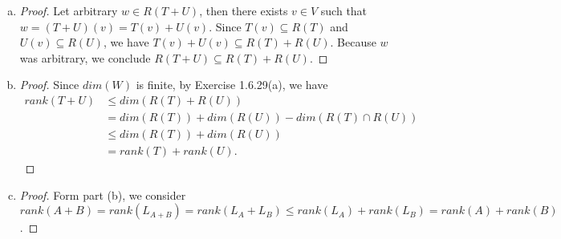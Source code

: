 \begin{Exercise}
\begin{enumerate}[(a)]
\item
\begin{proof}
Let arbitrary $w\in R(T+U)$, then there exists $v\in V$ such that $w=(T+U)(v) = T(v)+U(v)$. Since $T(v) \subseteq R(T)$ and $U(v) \subseteq R(U)$, we have $T(v)+U(v) \subseteq R(T)+R(U)$. Because $w$ was arbitrary, we conclude $R(T+U)\subseteq R(T)+R(U)$.
\end{proof}

\item
\begin{proof}
Since $dim(W)$ is finite, by Exercise 1.6.29(a), we have
\begin{align*}
rank(T+U)
&\leq dim(R(T)+R(U)) \\
&= dim(R(T)) + dim(R(U)) - dim(R(T)\cap R(U)) \\
&\leq dim(R(T)) + dim(R(U)) \\
&= rank(T)+rank(U).
\end{align*}
\end{proof}

\item
\begin{proof}
Form part (b), we consider $rank(A+B) = rank(L_{A+B}) = rank(L_A+L_B) \leq rank(L_A) + rank(L_B) = rank(A) + rank(B)$.
\end{proof}

\end{enumerate}
\end{Exercise}